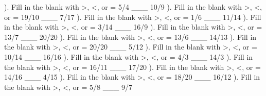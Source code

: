 \documentclass{article}%
\begin{document}
\newline%
). Fill in the blank with >, <, or = 5/4 \_\_\_ 10/9%
\newline%
\newline%
). Fill in the blank with >, <, or = 19/10 \_\_\_ 7/17%
\newline%
\newline%
). Fill in the blank with >, <, or = 1/6 \_\_\_ 11/14%
\newline%
\newline%
). Fill in the blank with >, <, or = 3/14 \_\_\_ 16/9%
\newline%
\newline%
). Fill in the blank with >, <, or = 13/7 \_\_\_ 20/20%
\newline%
\newline%
). Fill in the blank with >, <, or = 13/6 \_\_\_ 14/13%
\newline%
\newline%
). Fill in the blank with >, <, or = 20/20 \_\_\_ 5/12%
\newline%
\newline%
). Fill in the blank with >, <, or = 10/14 \_\_\_ 16/16%
\newline%
\newline%
). Fill in the blank with >, <, or = 4/3 \_\_\_ 14/3%
\newline%
\newline%
). Fill in the blank with >, <, or = 16/11 \_\_\_ 17/20%
\newline%
\newline%
). Fill in the blank with >, <, or = 14/16 \_\_\_ 4/15%
\newline%
\newline%
). Fill in the blank with >, <, or = 18/20 \_\_\_ 16/12%
\newline%
\newline%
). Fill in the blank with >, <, or = 5/8 \_\_\_ 9/7%
\end{document}

